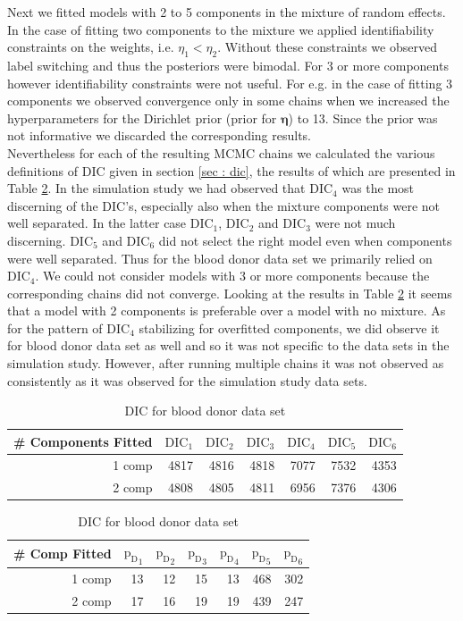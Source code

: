 Next we fitted models with 2 to 5 components in the mixture of random effects. In the case of fitting two components to the mixture we applied identifiability constraints on the weights, i.e. $\eta_1 < \eta_2$. Without these constraints we observed label switching and thus the posteriors were bimodal. For 3 or more components however identifiability constraints were not useful. For e.g. in the case of fitting 3 components we observed convergence only in some chains when we increased the hyperparameters for the Dirichlet prior (prior for $\boldsymbol{\eta}$) to 13. Since the prior was not informative we discarded the corresponding results.\\

Nevertheless for each of the resulting MCMC chains we calculated the various definitions of DIC given in section \ref{sec : dic}, the results of which are presented in Table \ref{table : dic_blood_donor}. In the simulation study we had observed that $\text{DIC}_4$ was the most discerning of the DIC's, especially also when the mixture components were not well separated. In the latter case $\text{DIC}_1$, $\text{DIC}_2$ and $\text{DIC}_3$ were not much discerning. $\text{DIC}_5$ and $\text{DIC}_6$ did not select the right model even when components were well separated. Thus for the blood donor data set we primarily relied on $\text{DIC}_4$. We could not consider models with 3 or more components because the corresponding chains did not converge. Looking at the results in Table \ref{table : dic_blood_donor} it seems that a model with 2 components is preferable over a model with no mixture. As for the pattern of $\text{DIC}_4$ stabilizing for overfitted components, we did observe it for blood donor data set as well and so it was not specific to the data sets in the simulation study. However, after running multiple chains it was not observed as consistently as it was observed for the simulation study data sets.

\begin{table}[!htb]
\centering
\captionsetup{justification=centering}
\caption{DIC for blood donor data set}
\label{table : dic_blood_donor}
\begin{tabular}{@{}rrrrrrr@{}}
\toprule
\# Components Fitted & $\text{DIC}_1$ & $\text{DIC}_2$ & $\text{DIC}_3$  & $\text{DIC}_4$  & $\text{DIC}_5$  & $\text{DIC}_6$  \\ \midrule
1 comp & 4817 & 4816 & 4818 & 7077 & 7532 & 4353 \\
2 comp & 4808 & 4805 & 4811 & 6956 & 7376 & 4306 \\
\bottomrule
\end{tabular}
\begin{tabular}{@{}rrrrrrr@{}}
\toprule
\# Comp Fitted & ${\text{p}_\text{D}}_1$ & ${\text{p}_\text{D}}_2$ & ${\text{p}_\text{D}}_3$ & ${\text{p}_\text{D}}_4$ & ${\text{p}_\text{D}}_5$ & ${\text{p}_\text{D}}_6$ \\ \midrule
1 comp & 13 & 12 & 15 & 13 & 468 & 302 \\
2 comp & 17 & 16 & 19 & 19 & 439 & 247 \\
\bottomrule
\end{tabular}
\end{table}

